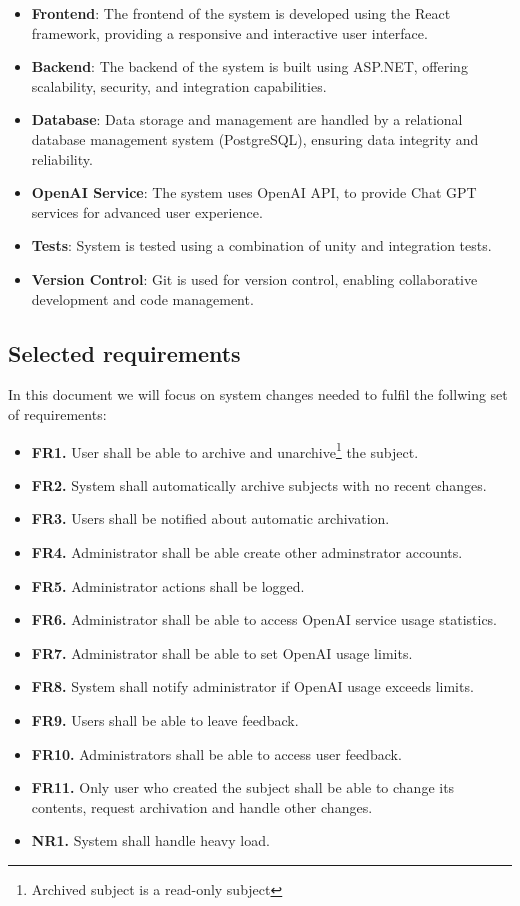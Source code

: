 \documentclass[
    english, %
]{VUMIFPSkursinis}
\begin{document}
\begin{itemize}
    \item \textbf{Frontend}: The frontend of the system is developed using the React framework, providing a responsive and interactive user interface.
    \item \textbf{Backend}: The backend of the system is built using ASP.NET, offering scalability, security, and integration capabilities.
    \item \textbf{Database}: Data storage and management are handled by a relational database management system (PostgreSQL), ensuring data integrity and reliability.
    \item \textbf{OpenAI Service}: The system uses OpenAI API, to provide Chat GPT services for advanced user experience.
    \item \textbf{Tests}: System is tested using a combination of unity and integration tests.
    \item \textbf{Version Control}: Git is used for version control, enabling collaborative development and code management.
\end{itemize}

\subsection{Selected requirements}
In this document we will focus on system changes needed to fulfil the follwing set of requirements:

\begin{itemize}
    \item \textbf{FR1.} User shall be able to archive and unarchive\footnote{Archived subject is a read-only subject} the subject.
    \item \textbf{FR2.} System shall automatically archive subjects with no recent changes.
    \item \textbf{FR3.} Users shall be notified about automatic archivation.
    \item \textbf{FR4.} Administrator shall be able create other adminstrator accounts.
    \item \textbf{FR5.} Administrator actions shall be logged.
    \item \textbf{FR6.} Administrator shall be able to access OpenAI service usage statistics.
    \item \textbf{FR7.} Administrator shall be able to set OpenAI usage limits.
    \item \textbf{FR8.} System shall notify administrator if OpenAI usage exceeds limits.
    \item \textbf{FR9.} Users shall be able to leave feedback.
    \item \textbf{FR10.} Administrators shall be able to access user feedback.
    \item \textbf{FR11.} Only user who created the subject shall be able to change its contents, request archivation and handle other changes.
    \item \textbf{NR1.} System shall handle heavy load.
\end{itemize}
\end{document}
